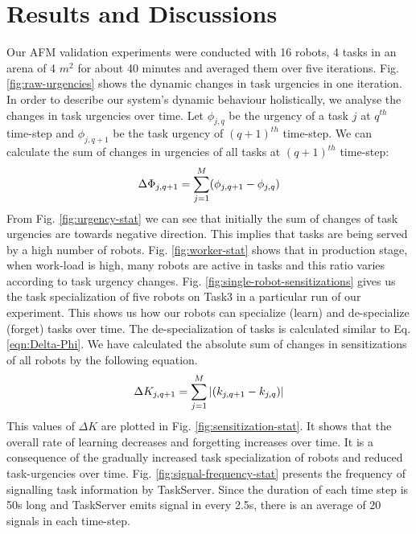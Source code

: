 \documentclass{llncs}
\begin{document}
\section{Results and Discussions}
\label{sec:results}
Our AFM validation experiments were conducted with 16 robots, 4 tasks in an arena of 4 $m^2$ for about 40 minutes and averaged them over five iterations.
Fig. \ref{fig:raw-urgencies} shows the dynamic changes in task urgencies in one iteration.  In order to describe our system's dynamic behaviour holistically, we analyse the changes in task urgencies over time. Let $ \phi_{j, q}$ be the urgency of a task $j$ at $q^{th}$ time-step and $\phi_{j, q+1}$ be the task urgency of $(q+1)^{th}$ time-step. We can calculate the sum of changes in urgencies of all tasks at $(q+1)^{th}$ time-step:
\begin{equation} 
\small
\Delta \Phi_{j, q+1} = \sum_{j=1}^{M} (\phi_{j, q+1} - \phi_{j, q})
\label{eqn:Delta-Phi}
\end{equation}
From Fig. \ref{fig:urgency-stat} we can see that initially the sum of changes of task urgencies are towards negative direction. This implies that tasks are being served by a high number of robots. Fig. \ref{fig:worker-stat} shows that in production stage, when  work-load is high, many robots are active in tasks and this ratio varies according to task urgency changes.
Fig. \ref{fig:single-robot-sensitizations} gives us the task specialization of five robots on Task3 in a particular run of our experiment. This shows us how our robots can specialize (learn) and de-specialize (forget) tasks over time. The de-specialization of tasks is calculated similar to Eq. \ref{eqn:Delta-Phi}. We have calculated the absolute sum of changes in sensitizations of all robots by the following equation.
% 
\begin{equation}
\small 
\Delta K_{j, q+1} = \sum_{j=1}^{M} \left | (k_{j, q+1} - k_{j, q}) \right |
\label{eqn:Delta-K}
\end{equation}
This values of $\Delta K$ are plotted in Fig. \ref{fig:sensitization-stat}. It shows that the overall rate of learning decreases and forgetting increases over time. It is a consequence of the gradually increased task specialization of robots and reduced task-urgencies over time.
Fig. \ref{fig:signal-frequency-stat} presents the frequency of signalling task information by TaskServer. Since the duration of each time step is 50s long and TaskServer emits signal in every 2.5s, there is an average of 20 signals in each time-step.
\end{document}
